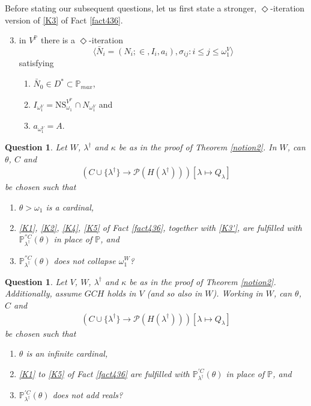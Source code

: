 \documentclass[12pt, twoside]{memoir}
\numberwithin{equation}{section}
\newtheorem{ques}[thm]{Question}
\theoremstyle{definition}
\theoremstyle{remark}
\theoremstyle{definition}
\theoremstyle{definition}
\theoremstyle{definition}
\theoremstyle{remark}
\begin{document}
Before stating our subsequent questions, let us first state a stronger, $\Diamond$-iteration version of \ref{K3} of Fact \ref{fact436}.
\begin{enumerate}[label=(K\arabic*'), leftmargin=40pt]
    \setcounter{enumi}{2}
    \item\label{K3'} in $V^{\mathbb{P}}$ there is a $\Diamond$-iteration $$\langle \bar{N}_i = (N_i; \in, I_i, a_i), \sigma_{ij} : i \leq j \leq \omega_1^V \rangle$$ satisfying 
    \begin{enumerate}[label=(\arabic*), leftmargin=40pt]
        \item\label{k31'} $\bar{N}_0 \in D^* \subset \mathbb{P}_{max}$,
        \item\label{k32'} $I_{\omega_1^V} = \mathrm{NS}_{\omega_1}^{V^{\mathbb{P}}} \cap N_{\omega_1^V}$ and
        \item\label{k33'} $a_{\omega_1^V} = A$.
    \end{enumerate} 
\end{enumerate}

\begin{ques}\label{oq2'}
Let $W$, $\lambda^{\dagger}$ and $\kappa$ be as in the proof of Theorem \ref{notion2}. In $W$, can $\theta$, $C$ and
\begin{gather*}
    (C \cup \{\lambda^{\dagger}\} \longrightarrow \mathcal{P}(H(\lambda^{\dagger}))) [\lambda \mapsto Q_{\lambda}]
\end{gather*}
be chosen such that 
\begin{enumerate}[label=(\arabic*)]
    \item $\theta > \omega_1$ is a cardinal,
    \item \ref{K1}, \ref{K2}, \ref{K4}, \ref{K5} of Fact \ref{fact436}, together with \ref{K3'}, are fulfilled with $\mathbb{P}^{''C}_{\lambda^{\dagger}}(\theta)$ in place of $\mathbb{P}$, and
    \item $\mathbb{P}^{''C}_{\lambda^{\dagger}}(\theta)$ does not collapse $\omega_1^W$?
\end{enumerate}
\end{ques}

\begin{ques}\label{addsreals2}
Let $V$, $W$, $\lambda^{\dagger}$ and $\kappa$ be as in the proof of Theorem \ref{notion2}. Additionally, assume $GCH$ holds in $V$ (and so also in $W$). Working in  $W$, can $\theta$, $C$ and 
\begin{gather*}
    (C \cup \{\lambda^{\dagger}\} \longrightarrow \mathcal{P}(H(\lambda^{\dagger}))) [\lambda \mapsto Q_{\lambda}]
\end{gather*}
be chosen such that
\begin{enumerate}[label=(\arabic*)]
    \item $\theta$ is an infinite cardinal,
    \item \ref{K1} to \ref{K5} of Fact \ref{fact436} are fulfilled with $\mathbb{P}^{'C}_{\lambda^{\dagger}}(\theta)$ in place of $\mathbb{P}$, and
    \item $\mathbb{P}^{'C}_{\lambda^{\dagger}}(\theta)$ does not add reals?
\end{enumerate}
\end{ques}
\end{document}
